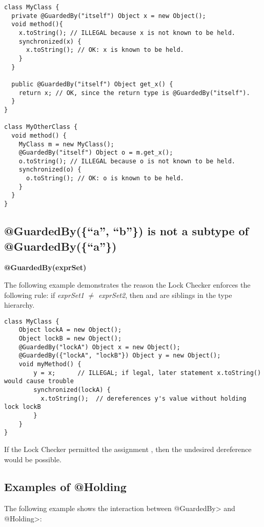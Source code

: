 \begin{Verbatim}
class MyClass {
  private @GuardedBy("itself") Object x = new Object();
  void method(){
    x.toString(); // ILLEGAL because x is not known to be held.
    synchronized(x) {
      x.toString(); // OK: x is known to be held.
    }
  }

  public @GuardedBy("itself") Object get_x() {
    return x; // OK, since the return type is @GuardedBy("itself").
  }
}

class MyOtherClass {
  void method() {
    MyClass m = new MyClass();
    @GuardedBy("itself") Object o = m.get_x();
    o.toString(); // ILLEGAL because o is not known to be held.
    synchronized(o) {
      o.toString(); // OK: o is known to be held.
    }
  }
}
\end{Verbatim}


\subsection{@GuardedBy(\{``a'', ``b''\}) is not a subtype of @GuardedBy(\{``a''\})\label{lock-guardedby-invariant-subtyping}}


\textbf{@GuardedBy(exprSet)}

The following example demonstrates the reason the Lock Checker enforces the
following rule:  if \emph{exprSet1} $\neq$ \emph{exprSet2}, then
 and  are siblings in the type
hierarchy.

\begin{Verbatim}
class MyClass {
    Object lockA = new Object();
    Object lockB = new Object();
    @GuardedBy("lockA") Object x = new Object();
    @GuardedBy({"lockA", "lockB"}) Object y = new Object();
    void myMethod() {
        y = x;      // ILLEGAL; if legal, later statement x.toString() would cause trouble
        synchronized(lockA) {
          x.toString();  // dereferences y's value without holding lock lockB
        }
    }
}
\end{Verbatim}


If the Lock Checker permitted the assignment
, then the undesired dereference would be possible.


\subsection{Examples of @Holding\label{lock-examples-holding}}

The following example shows the interaction between \<@GuardedBy> and
\<@Holding>:

